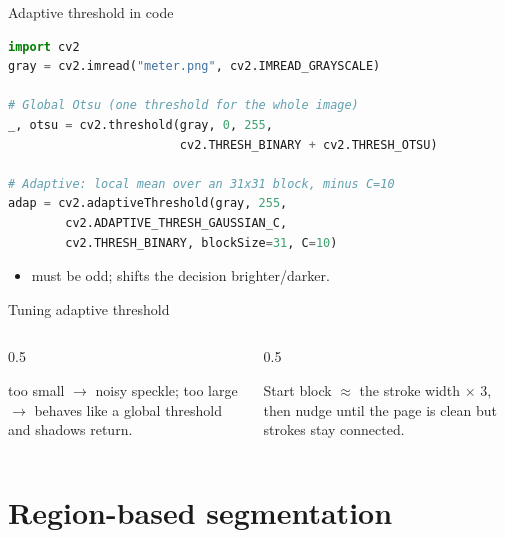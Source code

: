 \documentclass[10pt,aspectratio=169]{beamer}
\begin{document}
\begin{frame}[fragile]{Adaptive threshold in code}
\begin{lstlisting}[language=Python]
import cv2
gray = cv2.imread("meter.png", cv2.IMREAD_GRAYSCALE)

# Global Otsu (one threshold for the whole image)
_, otsu = cv2.threshold(gray, 0, 255,
                        cv2.THRESH_BINARY + cv2.THRESH_OTSU)

# Adaptive: local mean over an 31x31 block, minus C=10
adap = cv2.adaptiveThreshold(gray, 255,
        cv2.ADAPTIVE_THRESH_GAUSSIAN_C,
        cv2.THRESH_BINARY, blockSize=31, C=10)
\end{lstlisting}
  \begin{itemize}
    \item {} must be odd;  shifts the decision brighter/darker.
  \end{itemize}
\end{frame}

\begin{frame}{Tuning adaptive threshold}
  \begin{columns}[T]
    \begin{column}{0.5\textwidth}
      \begin{badbox}
         too small $\to$ noisy speckle; too large $\to$ behaves like a
        global threshold and shadows return.
      \end{badbox}
    \end{column}
    \begin{column}{0.5\textwidth}
      \begin{goodbox}
        Start block $\approx$ the stroke width $\times$ 3, then nudge  until the
        page is clean but strokes stay connected.
      \end{goodbox}
    \end{column}
  \end{columns}
\end{frame}

\section{Region-based segmentation}
\end{document}
